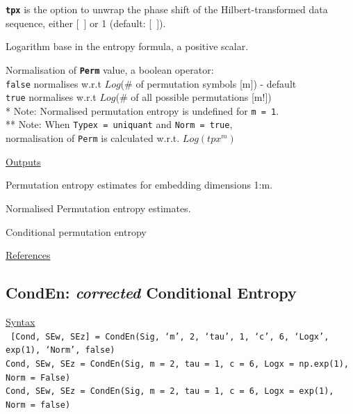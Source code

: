\documentclass[12pt, a4paper, titlepage, openany]{book}
\begin{document}
\begin{description}[labelsep=1cm, labelwidth=2cm, nosep, style=multiline,leftmargin=3cm]
\begin{description}[labelsep=10em, labelwidth=4em, nosep,style=multiline,leftmargin=3cm]
	\item[\texttt{\emph{phase}}]	\textbf{\texttt{tpx}} is the option to unwrap the phase shift of the Hilbert-transformed data sequence, either [\ ] or 1 (default: [\ ]).				
	\end{description}
\item[\texttt{Logx}]	Logarithm base in the entropy formula, a positive scalar.
\item[\texttt{Norm}]    Normalisation of \texttt{\textbf{Perm}} value, a boolean operator:\\
					\texttt{false} \hspace{10pt} normalises w.r.t $Log$($\#$ of permutation symbols [m]) - default\\
     		  		\texttt{true} \hspace{15pt} normalises w.r.t $Log$($\#$ of all possible permutations [m!])\\
     		  			* Note: Normalised permutation entropy is undefined for \texttt{m = 1}.\\
     		  			** Note: When \texttt{Typex = uniquant} and \texttt{Norm = true},\\ 									normalisation of \texttt{Perm} is calculated w.r.t. $Log(tpx^m)$
\end{description}

\noindent \ul{Outputs}
\begin{description}[labelsep=1cm, labelwidth=2cm, nosep, style=multiline,leftmargin=3cm]\footnotesize
\item[\texttt{Perm}]	Permutation entropy estimates for embedding dimensions 1:m.
\item[\texttt{Pnorm}]	Normalised Permutation entropy estimates.
\item[\texttt{cPE}]		Conditional permutation entropy \cite{Perm8}
\end{description}

\noindent \ul{References}\hspace{1cm}
\cite{Perm1} \cite{Perm2} \cite{Perm3} \cite{Perm4} \cite{Perm5} \cite{Perm6} \cite{Perm7} \cite{Perm8} \cite{Perm9}



\newpage
\subsection{\normalsize CondEn: \hspace{15mm} \textit{corrected} Conditional Entropy} \label{CondEn}
\noindent\ul{Syntax} \vspace{6mm} \\ \noindent \texttt{\footnotesize
[Cond, SEw, SEz] = CondEn(Sig, ‘m’, 2, ‘tau’, 1, ‘c’, 6, ‘Logx’, exp(1), ‘Norm’, false)\\
 Cond, SEw, SEz  = CondEn(Sig, m = 2, tau = 1, c = 6, Logx = np.exp(1), Norm = False) \\
Cond, SEw, SEz  = CondEn(Sig, m = 2, tau = 1, c = 6, Logx = exp(1), Norm = false)}
\end{document}

